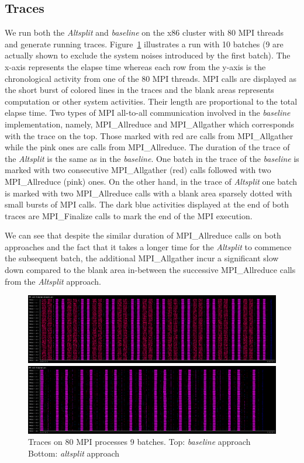 \subsection{Traces}
\label{sec:altsplit_trace}
We run both the \emph{Altsplit} and \emph{baseline} on the x86 cluster with
80 MPI threads and generate running traces. Figure~\ref{fig:altsplit_traces}
illustrates a run with 10 batches (9 are actually shown to exclude the system
noises introduced by the first batch). The x-axis represents the elapse time
whereas each row from the y-axis is the chronological activity from one of
the 80 MPI threads. MPI calls are displayed as the short burst of colored
lines in the traces and the blank areas represents computation or other
system activities. Their length are proportional to the total elapse time.
Two types of MPI all-to-all communication involved in the \emph{baseline}
implementation, namely, MPI\_Allreduce and MPI\_Allgather which corresponds
with the trace on the top. Those marked with red are calls from
MPI\_Allgather while the pink ones are calls from MPI\_Allreduce. The
duration of the trace of the \emph{Altsplit} is the same as in the
\emph{baseline}. One batch in the trace of the \emph{baseline} is marked with
two consecutive MPI\_Allgather (red) calls followed with two MPI\_Allreduce
(pink) ones. On the other hand, in the trace of \emph{Altsplit} one batch is
marked with two MPI\_Allreduce calls with a blank area sparsely dotted with small
bursts of MPI calls. The dark blue activities displayed at the end of both
traces are MPI\_Finalize calls to mark the end of the MPI execution.

We can see that despite the similar duration of MPI\_Allreduce calls on both
approaches and the fact that it takes a longer time for the \emph{Altsplit} to 
commence the subsequent batch, the additional MPI\_Allgather incur a significant 
slow down compared to the blank area in-between the successive MPI\_Allreduce 
calls from the \emph{Altsplit} approach.

\begin{figure}[H]
    \centerline{\includegraphics[scale=0.30]{altsplit/figs/baseline_trace.png}}
    \centerline{\includegraphics[scale=0.30]{altsplit/figs/altsplit_trace.png}}
    \caption{Traces on 80 MPI processes 9 batches. Top: \emph{baseline} approach Bottom: \emph{altsplit} approach}
    \label{fig:altsplit_traces}
\end{figure}
